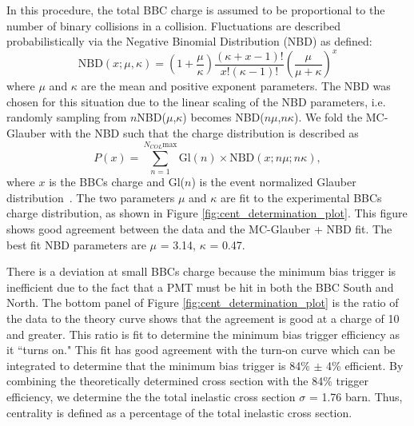 In this procedure, the total BBC charge is assumed to be proportional to the number of binary collisions in a \pau collision. Fluctuations are described probabilistically via the Negative Binomial Distribution (NBD) as defined:
\begin{equation}
   \textrm{NBD}(x;\mu,\kappa) = \left(1+\frac{\mu}{\kappa}\right)\frac{(\kappa+x-1)!}{x!(\kappa-1)!}\left(\frac{\mu}{\mu+\kappa}\right)^x
\end{equation}
where $\mu$ and $\kappa$ are the mean and positive exponent parameters. The NBD was chosen for this situation due to the linear scaling of the NBD parameters, i.e. randomly sampling from $n$NBD($\mu$,$\kappa$) becomes NBD($n\mu$,$n\kappa$). We fold the MC-Glauber with the NBD such that the charge distribution is described as
\begin{equation}
   P(x) = \sum^{N_{COL}\textrm{max}}_{n=1} \textrm{Gl}(n)\times \textrm{NBD}(x;n\mu;n\kappa),
\end{equation}
where $x$ is the BBCs charge and Gl($n$) is the event normalized Glauber distribution~\cite{PhysRevC.90.034902}. The two parameters $\mu$ and $\kappa$ are fit to the experimental BBCs charge distribution, as shown in Figure \ref{fig:cent_determination_plot}. This figure shows good agreement between the data and the MC-Glauber + NBD fit. The best fit NBD parameters are $\mu$ = 3.14, $\kappa$ = 0.47. 

There is a deviation at small BBCs charge because the minimum bias trigger is inefficient due to the fact that a PMT must be hit in both the BBC South and North. The bottom panel of Figure \ref{fig:cent_determination_plot} is the ratio of the data to the theory curve shows that the agreement is good at a charge of 10 and greater. This ratio is fit to determine the minimum bias trigger efficiency as it ``turns on." This fit has good agreement with the turn-on curve which can be integrated to determine that the minimum bias trigger is 84\% $\pm$ 4\% efficient. By combining the theoretically determined \pau cross section with the 84\% trigger efficiency, we determine the the total inelastic \pau cross section $\sigma$ = 1.76 barn. Thus, centrality is defined as a percentage of the total inelastic cross section.

